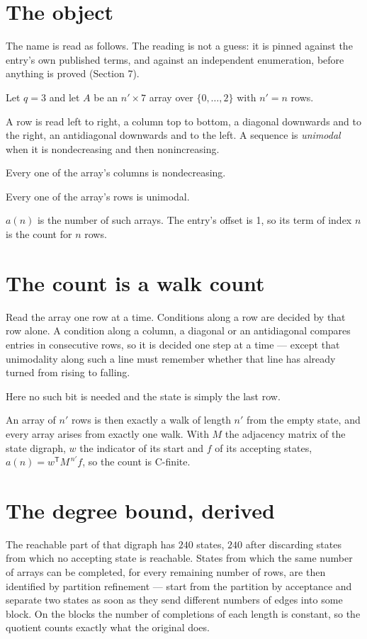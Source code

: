 \documentclass[11pt]{article}
\theoremstyle{definition}
\begin{document}
\section{The object}

The name is read as follows. The reading is not a guess: it is pinned against the entry's own published terms, and against an independent enumeration, before anything is proved (Section 7).

Let $q = 3$ and let $A$ be an $n' \times 7$ array over $\{0,\dots,2\}$ with $n' = n$ rows.

A row is read left to right, a column top to bottom, a diagonal downwards and to the right, an antidiagonal downwards and to the left. A sequence is {\itshape unimodal} when it is nondecreasing and then nonincreasing.

Every one of the array's columns is nondecreasing.

Every one of the array's rows is unimodal.

$a(n)$ is the number of such arrays. The entry's offset is 1, so its term of index $n$ is the count for $n$ rows.

\section{The count is a walk count}

Read the array one row at a time. Conditions along a row are decided by that row alone. A condition along a column, a diagonal or an antidiagonal compares entries in consecutive rows, so it is decided one step at a time --- except that unimodality along such a line must remember whether that line has already turned from rising to falling.

Here no such bit is needed and the state is simply the last row.

An array of $n'$ rows is then exactly a walk of length $n'$ from the empty state, and every array arises from exactly one walk. With $M$ the adjacency matrix of the state digraph, $w$ the indicator of its start and $f$ of its accepting states, $a(n) = w^{\mathsf T}M^{\,n'}f$, so the count is C-finite.

\section{The degree bound, derived}

The reachable part of that digraph has $240$ states, $240$ after discarding states from which no accepting state is reachable. States from which the same number of arrays can be completed, for every remaining number of rows, are then identified by partition refinement --- start from the partition by acceptance and separate two states as soon as they send different numbers of edges into some block. On the blocks the number of completions of each length is constant, so the quotient counts exactly what the original does.
\end{document}
